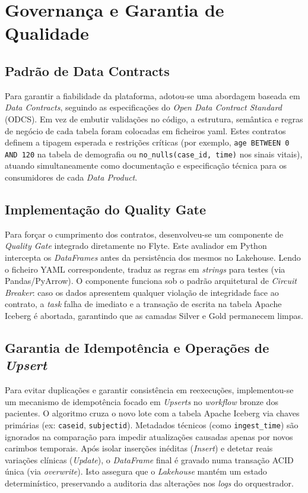 \section{Governança e Garantia de Qualidade} \label{sec:governanca_garantia_qualidade}

\subsection{Padrão de Data Contracts} \label{subsec:padrao_data_products}
Para garantir a fiabilidade da plataforma, adotou-se uma abordagem baseada em \textit{Data Contracts}, seguindo as especificações do \textit{Open Data Contract Standard} (ODCS). Em vez de embutir validações no código, a estrutura, semântica e regras de negócio de cada tabela foram colocadas em ficheiros yaml. Estes contratos definem a tipagem esperada e restrições críticas (por exemplo, \texttt{age BETWEEN 0 AND 120} na tabela de demografia ou \texttt{no\_nulls(case\_id, time)} nos sinais vitais), atuando simultaneamente como documentação e especificação técnica para os consumidores de cada \textit{Data Product}.

\subsection{Implementação do Quality Gate} \label{subsec:implementacao_quality_gate}
Para forçar o cumprimento dos contratos, desenvolveu-se um componente de \textit{Quality Gate} integrado diretamente no Flyte. Este avaliador em Python intercepta os \textit{DataFrames} antes da persistência dos mesmos no Lakehouse. Lendo o ficheiro YAML correspondente, traduz as regras em \textit{strings} para testes (via Pandas/PyArrow). O componente funciona sob o padrão arquitetural de \textit{Circuit Breaker}: caso os dados apresentem qualquer violação de integridade face ao contrato, a \textit{task} falha de imediato e a transação de escrita na tabela Apache Iceberg é abortada, garantindo que as camadas Silver e Gold permanecem limpas.

\subsection{Garantia de Idempotência e Operações de \textit{Upsert}} \label{subsec:garantia_idempotencia}
Para evitar duplicações e garantir consistência em reexecuções, implementou-se um mecanismo de idempotência focado em \textit{Upserts} no \textit{workflow} bronze dos pacientes. O algoritmo cruza o novo lote com a tabela Apache Iceberg via chaves primárias (ex: \texttt{caseid}, \texttt{subjectid}). Metadados técnicos (como \texttt{ingest\_time}) são ignorados na comparação para impedir atualizações causadas apenas por novos carimbos temporais. Após isolar inserções inéditas (\textit{Insert}) e detetar reais variações clínicas (\textit{Update}), o \textit{DataFrame} final é gravado numa transação ACID única (via \textit{overwrite}). Isto assegura que o \textit{Lakehouse} mantém um estado determinístico, preservando a auditoria das alterações nos \textit{logs} do orquestrador.

